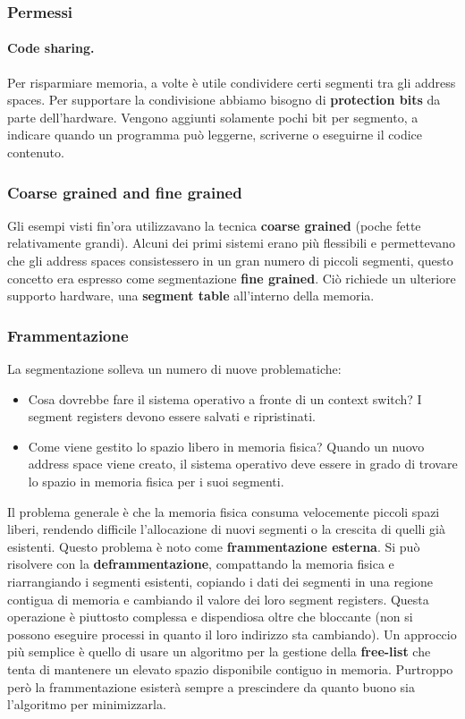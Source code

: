 \documentclass[12pt, letterpaper]{article}
\begin{document}
			\subsubsection{Permessi}
				\paragraph{Code sharing. }Per risparmiare memoria, a volte è  utile condividere certi segmenti tra gli address spaces. Per supportare la condivisione abbiamo bisogno di \textbf{protection bits} da parte dell'hardware. Vengono aggiunti solamente pochi bit per segmento, a indicare quando un programma può leggerne, scriverne o eseguirne il codice contenuto. 
				
			\subsubsection{Coarse grained and fine grained}
				Gli esempi visti fin'ora utilizzavano la tecnica \textbf{coarse grained} (poche fette relativamente grandi). Alcuni dei primi sistemi erano più flessibili e permettevano che gli address spaces consistessero in un gran numero di piccoli segmenti, questo concetto era espresso come segmentazione \textbf{fine grained}. Ciò richiede un ulteriore supporto hardware, una \textbf{segment table} all'interno della memoria.
				
			\subsubsection{Frammentazione} 
				La segmentazione solleva un numero di nuove problematiche:
				\begin{itemize}
					\item Cosa dovrebbe fare il sistema operativo a fronte di un context switch? I segment registers devono essere salvati e ripristinati. 
					\item Come viene gestito lo spazio libero in memoria fisica? Quando un nuovo address space viene creato, il sistema operativo deve essere in grado di trovare lo spazio in memoria fisica per i suoi segmenti. 	
				\end{itemize}				 
				Il problema generale è che la memoria fisica consuma velocemente piccoli spazi liberi, rendendo difficile l'allocazione di nuovi segmenti o la crescita di quelli già esistenti. Questo problema è noto come \textbf{frammentazione esterna}. Si può risolvere con la \textbf{deframmentazione}, compattando la memoria fisica e riarrangiando i segmenti esistenti, copiando i dati dei segmenti in una regione contigua di memoria e cambiando il valore dei loro segment registers. Questa operazione è piuttosto complessa e dispendiosa oltre che bloccante (non si possono eseguire processi in quanto il loro indirizzo sta cambiando). Un approccio più semplice è quello di usare un algoritmo per la gestione della \textbf{free-list} che tenta di mantenere un elevato spazio disponibile contiguo in memoria. Purtroppo però la frammentazione esisterà sempre a prescindere da quanto buono sia l'algoritmo per minimizzarla.
				
\end{document}
